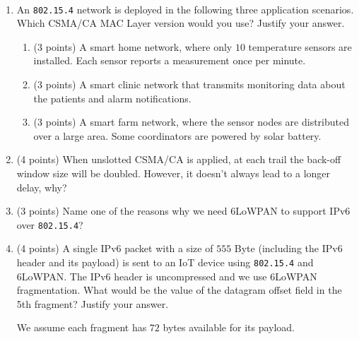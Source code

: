 \documentclass[12pt]{article}
\begin{document}
    \begin{ejercicio}[20 points]
        ~
        \begin{enumerate}[label=\alph*)]
            \item An \verb|802.15.4| network is deployed in the following three application scenarios. Which CSMA/CA MAC Layer version would you use? Justify your answer.
            \begin{enumerate}[label=\roman*)]
                \item (3 points) A smart home network, where only $10$ temperature sensors are installed. Each sensor reports a measurement once per minute.
                \item (3 points) A smart clinic network that transmits monitoring data about the patients and alarm notifications.
                \item (3 points) A smart farm network, where the sensor nodes are distributed over a large area. Some coordinators are powered by solar battery.
            \end{enumerate}
            \item (4 points) When unslotted CSMA/CA is applied, at each trail the back-off window size will be doubled. However, it doesn't always lead to a longer delay, why?
            \item (3 points) Name one of the reasons why we need 6LoWPAN to support IPv6 over \verb|802.15.4|?
            \item (4 points) A single IPv6 packet with a size of $555$ Byte (including the IPv6 header and its payload) is sent to an IoT device using \verb|802.15.4| and 6LoWPAN. The IPv6 header is uncompressed and we use 6LoWPAN fragmentation. What would be the value of the datagram offset field in the 5th fragment? Justify your answer.
            
            \begin{observacion}
            We assume each fragment has $72$ bytes available for its payload.
            \end{observacion}
        \end{enumerate}
    \end{ejercicio}

    \newpage
\end{document}
